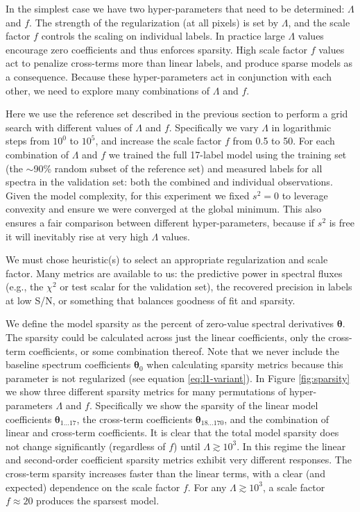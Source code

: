 \documentclass[12pt,preprint]{aastex}
\newcommand{\Dvector}[1]{\boldsymbol{#1}}
\newcommand{\vectheta}{\Dvector{\theta}}
\begin{document}
In the simplest case we have two hyper-parameters that need to be determined: 
$\Lambda$ and $f$.  The strength of the regularization (at all pixels) is set 
by $\Lambda$, and the scale factor $f$ controls the scaling on individual 
labels.  In practice large $\Lambda$ values encourage zero coefficients and thus enforces sparsity.  High scale factor $f$
values act to penalize cross-terms more than linear labels, and produce sparse
models as a consequence.  Because these hyper-parameters act in conjunction 
with each other, we need to explore many combinations of $\Lambda$ and $f$.


Here we use the reference set described in the previous section to perform a
grid search with different values of $\Lambda$ and $f$.  Specifically we vary 
$\Lambda$ in logarithmic steps from $10^0$ to $10^5$, and increase the 
scale factor $f$ from 0.5 to 50.  For each combination of $\Lambda$ and $f$ we 
trained the full 17-label model using the training set (the $\sim$90\% random
subset of the reference set) and measured labels for all spectra in the
validation set: both the combined and individual observations.  Given the model
complexity, for this experiment we fixed $s^2 = 0$ to leverage convexity
and ensure we were converged at the global minimum.  This also ensures a fair
comparison between different hyper-parameters, because if $s^2$ is free it
will inevitably rise at very high $\Lambda$ values.  


We must chose heuristic(s) to select an appropriate regularization and scale
factor.  Many metrics are available to us: the predictive power in spectral
fluxes (e.g., the $\chi^2$ or test scalar for the validation set), the 
recovered precision in labels at low S/N, or something that balances goodness of fit and sparsity.


We define the model sparsity as the percent of zero-value spectral derivatives 
$\vectheta$.  The sparsity could be calculated across just the linear 
coefficients, only the cross-term coefficients, or some combination thereof.  
Note that we never include the baseline spectrum coefficients $\vectheta_0$ when 
calculating sparsity metrics because this parameter is not regularized (see 
equation \ref{eq:l1-variant}).  In Figure \ref{fig:sparsity} we show three 
different sparsity metrics for many permutations of hyper-parameters $\Lambda$ 
and $f$.  Specifically we show the sparsity of the linear model coefficients 
$\vectheta_{1...17}$, the cross-term coefficients $\vectheta_{18...170}$, and 
the combination of linear and cross-term coefficients.  It is clear that the 
total model sparsity does not change significantly (regardless of $f$) until 
$\Lambda \gtrsim 10^3$.  In this regime the linear and second-order coefficient 
sparsity metrics exhibit very different responses.  The cross-term sparsity 
increases faster than the linear terms, with a clear (and expected) dependence 
on the scale factor $f$.  For any $\Lambda \gtrsim 10^3$, a scale factor 
$f \approx 20$ produces the sparsest model.
\end{document}
